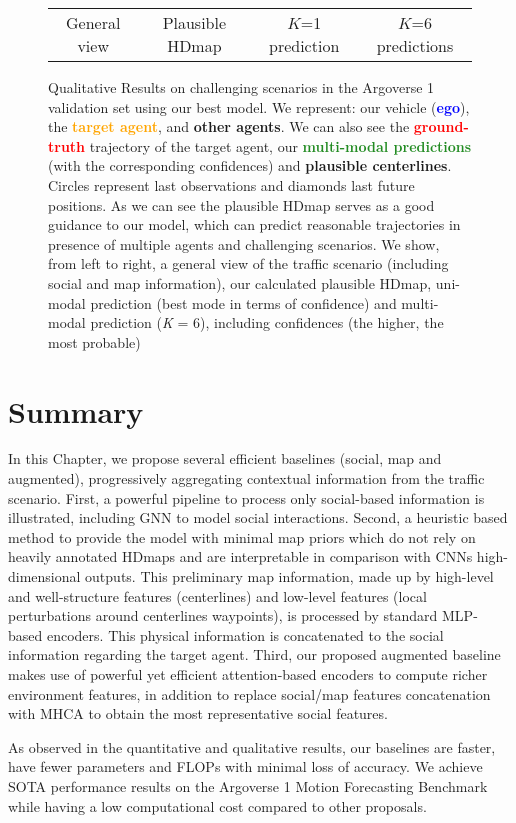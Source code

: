 \begin{figure}[h]
\begin{tabular}{cccc}
		\tabularnewline
		
		General view & Plausible \ac{HDmap} & $K$=1 prediction & $K$=6 predictions \tabularnewline
	\end{tabular}
	\captionsetup{justification=justified}
	\caption[Qualitative Results on challenging scenarios in the Argoverse 1 validation set using our best model]{Qualitative Results on challenging scenarios in the Argoverse 1 validation set using our best model.	We represent: our vehicle (\textbf{\textcolor{blue}{ego}}), the \textbf{\textcolor{orange}{target agent}}, and \textbf{\textcolor{gray75}{other agents}}. We can also see the \textbf{\textcolor{red}{ground-truth}} trajectory of the target agent, our \textbf{\textcolor{ForestGreen}{multi-modal predictions}} (with the corresponding confidences) and \textbf{plausible centerlines}. Circles represent last observations and diamonds last future positions. As we can see the plausible \ac{HDmap} serves as a good guidance to our model, which can predict reasonable trajectories in presence of multiple agents and challenging scenarios. We show, from left to right, a general view of the traffic scenario (including social and map information), our calculated plausible \ac{HDmap}, uni-modal prediction (best mode in terms of confidence) and multi-modal prediction (\textit{K} = 6), including confidences (the higher, the most probable)}
	\label{fig:chapter_6_Efficient_Baselines/argoverse_1_qualitative_results}
\end{figure}

\section{Summary}
\label{sec:6_summary}

In this Chapter, we propose several efficient baselines (social, map and augmented), progressively aggregating contextual information from the traffic scenario. First, a powerful pipeline to process only social-based information is illustrated, including \ac{GNN} to model social interactions. Second, a heuristic based method to provide the model with minimal map priors which do not rely on heavily annotated \acp{HDmap} and are interpretable in comparison with \acp{CNN} high-dimensional outputs. This preliminary map information, made up by high-level and well-structure features (centerlines) and low-level features (local perturbations around centerlines waypoints), is processed by standard \ac{MLP}-based encoders. This physical information is concatenated to the social information regarding the target agent. Third, our proposed augmented baseline makes use of powerful yet efficient attention-based encoders to compute richer environment features, in addition to replace social/map features concatenation with \ac{MHCA} to obtain the most representative social features.

As observed in the quantitative and qualitative results, our baselines are faster, have fewer parameters and \acp{FLOP} with minimal loss of accuracy. We achieve \ac{SOTA} performance results on the Argoverse 1 Motion Forecasting Benchmark while having a low computational cost compared to other proposals. 